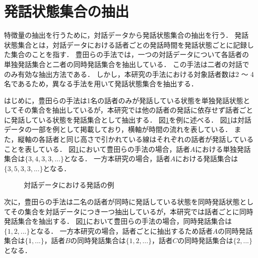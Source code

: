 \section{発話状態集合の抽出}

特徴量の抽出を行うために，対話データから発話状態集合の抽出を行う．
発話状態集合とは，対話データにおける話者ごとの発話時間を発話状態ごとに記録した集合のことを指す．
豊田らの手法では，一つの対話データについて各話者の単独発話集合と二者の同時発話集合を抽出している．
この手法は二者の対話でのみ有効な抽出方法である．
しかし，本研究の手法における対象話者数は2 〜 4名であるため，異なる手法を用いて発話状態集合を抽出する．

はじめに，豊田らの手法は1名の話者のみが発話している状態を単独発話状態としてその集合を抽出しているが，本研究では他の話者の発話に依存せず話者ごとに発話している状態を発話集合として抽出する．
図\ref{fig:speaker_split}を例に述べる．
図\ref{fig:speaker_split}は対話データの一部を例として掲載しており，横軸が時間の流れを表している．
また，縦軸の各話者と同じ高さで引かれている線はそれぞれの話者が発話していることを表している．
図\ref{fig:speaker_split}において豊田らの手法の場合，話者$A$における単独発話集合は$\{3, 4, 3, 3, ...\}$となる．
一方本研究の場合，話者$A$における発話集合は$\{3, 5, 3, 3, ...\}$となる．

\begin{figure}
    \centering
    \caption{対話データにおける発話の例}
    \label{fig:speaker_split}
\end{figure}

次に，豊田らの手法は二名の話者が同時に発話している状態を同時発話状態としてその集合を対話データにつき一つ抽出しているが，本研究では話者ごとに同時発話集合を抽出する．
図\ref{fig:speaker_split}において豊田らの手法の場合，同時発話集合は$\{1, 2, ...\}$となる．
一方本研究の場合，話者ごとに抽出するため話者$A$の同時発話集合は$\{1, ...\}$，話者$B$の同時発話集合は$\{1, 2, ...\}$，話者$C$の同時発話集合は$\{2, ...\}$となる．

